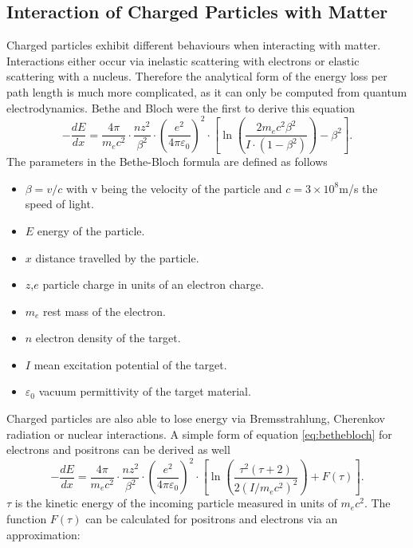 \subsection{Interaction of Charged Particles with Matter}
Charged particles exhibit different behaviours when interacting with matter. Interactions either occur via inelastic scattering with electrons or elastic scattering with a nucleus. Therefore the analytical form of the energy loss per path length is much more complicated, as it can only be computed from quantum electrodynamics. Bethe and Bloch were the first to derive this equation \cite{Leo}
\begin{equation}\label{eq:bethebloch}
- \frac{dE}{dx} = \frac{4 \pi}{m_e c^2} \cdot \frac{nz^2}{\beta^2} \cdot \left(\frac{e^2}{4\pi\varepsilon_0}\right)^2 \cdot \left[\ln \left(\frac{2m_e c^2 \beta^2}{I \cdot (1-\beta^2)}\right) - \beta^2\right].
\end{equation}
The parameters in the Bethe-Bloch formula are defined as follows
\begin{itemize}
\item $\beta = v/c$ with v being the velocity of the particle and $c=3\times 10^8$m/s the speed of light.
\item $E$ energy of the particle.
\item $x$ distance travelled by the particle.
\item $z$,$e$ particle charge in units of an electron charge.
\item $m_e$ rest mass of the electron.
\item $n$ electron density of the target.
\item $I$ mean excitation potential of the target.
\item $\varepsilon_0$ vacuum permittivity of the target material.
\end{itemize}
Charged particles are also able to lose energy via Bremsstrahlung, Cherenkov radiation or nuclear interactions. A simple form of equation \ref{eq:bethebloch} for electrons and positrons can be derived as well \cite{Leo}
\begin{equation}\label{eq:bethe}
- \frac{dE}{dx} = \frac{4 \pi}{m_e c^2} \cdot \frac{nz^2}{\beta^2} \cdot \left(\frac{e^2}{4\pi\varepsilon_0}\right)^2 \cdot \left[\ln\left(\frac{\tau^2(\tau + 2)}{2(I/m_ec^2)^2}\right)+F(\tau)\right].
\end{equation}
$\tau$ is the kinetic energy of the incoming particle measured in units of $m_ec^2$. The function $F(\tau)$ can be calculated for positrons and electrons via an approximation:
